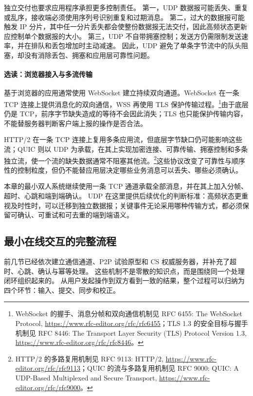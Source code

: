 独立交付也要求应用程序承担更多控制责任。
第一，UDP 数据报可能丢失、重复或乱序，接收端必须使用序列号识别重复和过期消息。
第二，过大的数据报可能触发 IP 分片，其中任一分片丢失都会使整份数据报无法交付，因此高频状态更新应控制单个数据报的大小。
第三，UDP 不自带拥塞控制；发送方仍需限制发送速率，并在排队和丢包增加时主动减速。
因此，UDP 避免了单条字节流中的队头阻塞，却没有消除丢包、拥塞和应用层可靠性问题。

\paragraph{选读：浏览器接入与多流传输}

基于浏览器的应用通常使用 WebSocket 建立持续双向通道。WebSocket 在一条 TCP 连接上提供消息化的双向通信，WSS 再使用 TLS 保护传输过程。\footnote{WebSocket 的握手、消息分帧和双向通信机制见 RFC 6455: The WebSocket Protocol, \url{https://www.rfc-editor.org/rfc/rfc6455}；TLS 1.3 的安全目标与握手机制见 RFC 8446: The Transport Layer Security (TLS) Protocol Version 1.3, \url{https://www.rfc-editor.org/rfc/rfc8446}。}由于底层仍是 TCP，前序字节缺失造成的等待不会因此消失；TLS 也只能保护传输内容，不能替服务器判断客户端上报的操作是否合法。

HTTP/2 在一条 TCP 连接上复用多条应用流，但底层字节缺口仍可能影响这些流；QUIC 则以 UDP 为承载，在其上实现加密连接、可靠传输、拥塞控制和多条独立流，使一个流的缺失数据通常不阻塞其他流。\footnote{HTTP/2 的多路复用机制见 RFC 9113: HTTP/2, \url{https://www.rfc-editor.org/rfc/rfc9113}；QUIC 的流与多路复用机制见 RFC 9000: QUIC: A UDP-Based Multiplexed and Secure Transport, \url{https://www.rfc-editor.org/rfc/rfc9000}。}这些协议改变了可靠性与顺序性的控制粒度，但仍不能替应用层决定哪些业务消息可以丢失、哪些必须确认。

本章的最小双人系统继续使用一条 TCP 通道承载全部消息，并在其上加入分帧、超时、心跳和端到端确认。
UDP 在这里提供后续优化的判断标准：高频状态更重视及时性时，可以迁移到独立数据报；关键事件无论采用哪种传输方式，都必须保留可确认、可重试和可去重的端到端语义。

\subsection{最小在线交互的完整流程}\label{sec2:battle-flow}

前几节已经依次建立通信通道、P2P 试验原型和 CS 权威服务器，并补充了超时、心跳、确认与幂等处理。
这些机制不是零散的知识点，而是围绕同一个处理闭环组织起来的。
从用户发起操作到双方看到一致的结果，整个过程可以归纳为四个环节：输入、提交、同步和校正。

